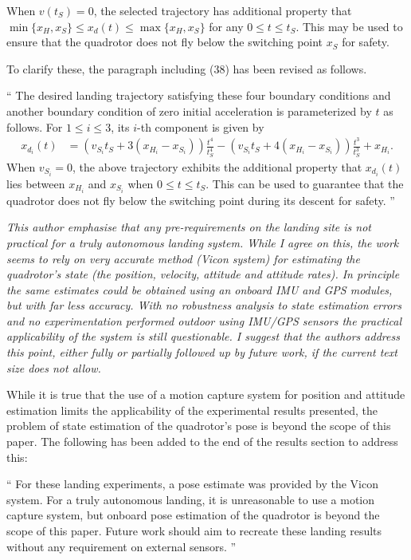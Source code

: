 \documentclass[11pt]{article}
\newenvironment{correction}{\begin{list}{}{\setlength{\leftmargin}{1cm}\setlength{\rightmargin}{1cm}}\vspace{\parsep}\item[]``}{''\end{list}}
\begin{document}
\begin{itemize}
When $v(t_S)=0$, the selected trajectory has additional property that $\min\{x_H,x_S\}\leq x_d(t) \leq \max\{x_H,x_S\}$ for any $0\leq t \leq t_S$. This may be used to ensure that the quadrotor does not fly below the switching point $x_S$ for safety. 

To clarify these, the paragraph including (38) has been revised as follows.

\begin{correction}
The desired landing trajectory satisfying these four boundary conditions and another boundary condition of zero initial acceleration is parameterized by $t$ as follows. 
For $1\leq i\leq 3$, its $i$-th component is given by
\begin{align}
x_{d_i}(t)& =(v_{S_i}t_S+3(x_{H_i}-x_{S_i}))\frac{t^4}{t_S^4} -(v_{S_i}t_S+4(x_{H_i}-x_{S_i}))\frac{t^3}{t_S^3}
+x_{H_i}.
\end{align}
When $v_{S_i}=0$, the above trajectory exhibits the additional property that $x_{d_i}(t)$ lies between $x_{H_i}$ and $x_{S_i}$ when $0\leq t\leq t_S$. This can be used to guarantee that the quadrotor does not fly below the switching point during its descent for safety. 
\end{correction}

\item
\textit{This author emphasise that any pre-requirements on the landing site is not practical for a truly autonomous landing system. While I agree on this, the work seems to rely on very accurate method (Vicon system) for estimating the quadrotor’s state (the position, velocity, attitude and attitude rates). In principle the same estimates could be obtained using an onboard IMU and GPS modules, but with far less accuracy. With no robustness analysis to state estimation errors and no experimentation performed outdoor using IMU/GPS sensors the practical applicability of the system is still questionable. I suggest that the authors address this point, either fully or partially followed up by future work, if the current text size does not allow.
}

While it is true that the use of a motion capture system for position and attitude estimation limits the applicability of the experimental results presented, the problem of state estimation of the quadrotor's pose is beyond the scope of this paper.
The following has been added to the end of the results section to address this:

\begin{correction}
For these landing experiments, a pose estimate was provided by the Vicon system. 
For a truly autonomous landing, it is unreasonable to use a motion
capture system, but onboard pose estimation of the quadrotor is beyond the scope of this paper.
Future work should aim to recreate these landing results  without any requirement on external sensors.
\end{correction}


\end{itemize}
\end{document}
